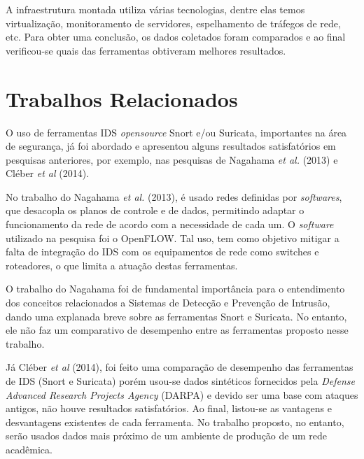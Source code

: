 A infraestrutura montada utiliza várias tecnologias, dentre elas temos virtualização, monitoramento de servidores, espelhamento de tráfegos de rede, etc. Para obter uma conclusão, os dados coletados foram comparados e ao final verificou-se quais das ferramentas obtiveram melhores resultados.

\section{Trabalhos Relacionados} \label{sec:trabalhos-relacionados}

O uso de ferramentas IDS \textit{opensource} Snort e/ou Suricata, importantes na área de segurança, já foi abordado e apresentou alguns resultados satisfatórios em pesquisas anteriores, por exemplo, nas pesquisas de Nagahama \textit{et al.} (2013) e Cléber \textit{et al} (2014).


No trabalho do Nagahama \textit{et al.} (2013), é usado redes definidas por \textit{softwares}, que desacopla os planos de controle e de dados, permitindo adaptar o funcionamento da rede de acordo com a necessidade de cada um. O \textit{software} utilizado na pesquisa foi o OpenFLOW. Tal uso, tem como objetivo mitigar a falta de integração do IDS com os equipamentos de rede como {switches} e roteadores, o que limita a atuação destas ferramentas. 

O trabalho do Nagahama foi de fundamental importância para o entendimento dos conceitos relacionados a Sistemas de Detecção e Prevenção de Intrusão, dando uma explanada breve sobre as ferramentas Snort e Suricata. No entanto, ele não faz um comparativo de desempenho entre as ferramentas proposto nesse trabalho.


Já Cléber \textit{et al} (2014), foi feito uma comparação de desempenho das ferramentas de IDS (Snort e Suricata) porém usou-se dados sintéticos fornecidos pela \textit{Defense Advanced Research Projects Agency} (DARPA) e devido ser uma base com ataques antigos, não houve resultados satisfatórios. Ao final, listou-se as vantagens e desvantagens existentes de cada ferramenta. No trabalho proposto, no entanto, serão usados dados mais próximo de um ambiente de produção de um rede acadêmica. 

